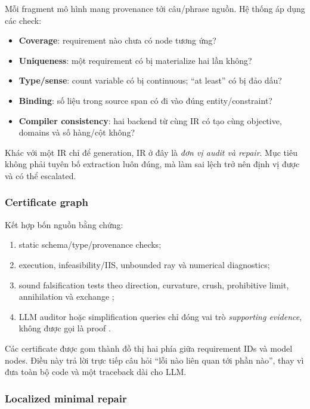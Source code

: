 \documentclass[11pt,a4paper]{article}
\begin{document}
Mỗi fragment mô hình mang provenance tới câu/phrase nguồn. Hệ thống áp dụng các check:

\begin{itemize}
  \item \textbf{Coverage}: requirement nào chưa có node tương ứng?
  \item \textbf{Uniqueness}: một requirement có bị materialize hai lần không?
  \item \textbf{Type/sense}: count variable có bị continuous; ``at least'' có bị đảo dấu?
  \item \textbf{Binding}: số liệu trong source span có đi vào đúng entity/constraint?
  \item \textbf{Compiler consistency}: hai backend từ cùng IR có tạo cùng objective, domains và số hàng/cột không?
\end{itemize}

Khác với một IR chỉ để generation, IR ở đây là \emph{đơn vị audit và repair}. Mục tiêu không phải tuyên bố extraction luôn đúng, mà làm sai lệch trở nên định vị được và có thể escalated.

\subsubsection{Certificate graph}

Kết hợp bốn nguồn bằng chứng:

\begin{enumerate}
  \item static schema/type/provenance checks;
  \item execution, infeasibility/IIS, unbounded ray và numerical diagnostics;
  \item sound falsification tests theo direction, curvature, crush, prohibitive limit, annihilation và exchange \parencite{li2026falsification};
  \item LLM auditor hoặc simplification queries chỉ đóng vai trò \emph{supporting evidence}, không được gọi là proof \parencite{rahman2026verisimpl,li2026optargus}.
\end{enumerate}

Các certificate được gom thành đồ thị hai phía giữa requirement IDs và model nodes. Điều này trả lời trực tiếp câu hỏi ``lỗi nào liên quan tới phần nào'', thay vì đưa toàn bộ code và một traceback dài cho LLM.

\subsubsection{Localized minimal repair}
\end{document}
